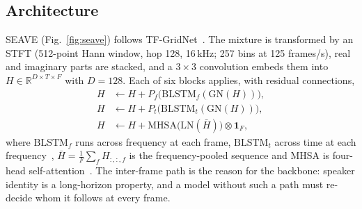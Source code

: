 \documentclass[conference]{IEEEtran}
\begin{document}
\subsection{Architecture}
SEAVE (Fig.~\ref{fig:seave}) follows TF-GridNet~\cite{wang2023tfgridnet}. The mixture is transformed by an STFT (512-point Hann window, hop 128, 16\,kHz; 257 bins at 125 frames/s), real and imaginary parts are stacked, and a $3{\times}3$ convolution embeds them into $H\in\mathbb{R}^{D\times T\times F}$ with $D=128$. Each of six blocks applies, with residual connections,
\begin{align}
H &\leftarrow H + P_f\big(\mathrm{BLSTM}_f(\mathrm{GN}(H))\big), \label{eq:intra}\\
H &\leftarrow H + P_t\big(\mathrm{BLSTM}_t(\mathrm{GN}(H))\big), \label{eq:inter}\\
H &\leftarrow H + \mathrm{MHSA}\big(\mathrm{LN}(\bar{H})\big)\otimes \mathbf{1}_F, \label{eq:attn}
\end{align}
where $\mathrm{BLSTM}_f$ runs across frequency at each frame, $\mathrm{BLSTM}_t$ across time at each frequency~\cite{hochreiter1997lstm}, $\bar{H}=\frac{1}{F}\sum_f H_{:,:,f}$ is the frequency-pooled sequence and MHSA is four-head self-attention~\cite{vaswani2017attention}. The inter-frame path is the reason for the backbone: speaker identity is a long-horizon property, and a model without such a path must re-decide whom it follows at every frame.
\end{document}

